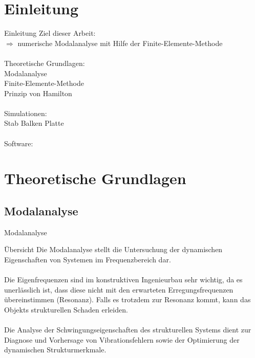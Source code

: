 \section{Einleitung}
\begin{frame}
	\begin{TUBAFoutblock}{Einleitung}
		Ziel dieser Arbeit:\\
		$ \Rightarrow $ numerische Modalanalyse mit Hilfe der Finite-Elemente-Methode\\
		\ \\ 
		Theoretische Grundlagen:\\
		\XBox Modalanalyse \\
		\XBox Finite-Elemente-Methode \\
		\XBox Prinzip von Hamilton\\
		\ \\
		Simulationen: \\
		\XBox Stab \qquad 	\XBox Balken \qquad \XBox Platte\\
		\ \\
		Software:\\
		\XBox \Matlab \qquad	\XBox \Ansys 
	\end{TUBAFoutblock}
\end{frame}



\section{Theoretische Grundlagen}
\subsection{Modalanalyse}

\begin{frame}{Modalanalyse}
	\begin{alertblock}{Übersicht}
		Die Modalanalyse stellt die Untersuchung der dynamischen Eigenschaften von Systemen im Frequenzbereich dar. \\
		\ \\
		Die Eigenfrequenzen sind im konstruktiven Ingenieurbau sehr wichtig, da es unerlässlich ist, dass diese nicht mit den erwarteten Erregungsfrequenzen übereinstimmen (Resonanz). Falls es trotzdem zur Resonanz kommt, kann das Objekts strukturellen Schaden erleiden. \\
		\ \\
		Die Analyse der Schwingungseigenschaften des strukturellen Systems dient zur Diagnose und Vorhersage von Vibrationsfehlern sowie der Optimierung der dynamischen Strukturmerkmale.
	\end{alertblock}
\end{frame}

